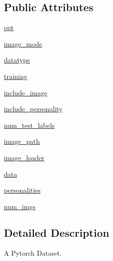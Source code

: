 \subsection*{Public Attributes}
\begin{DoxyCompactItemize}
\item 
\hyperlink{classparlai_1_1tasks_1_1personality__captions_1_1agents_1_1DefaultDataset_abe6bd53066bf10f26ef80157335cd6b9}{opt}
\item 
\hyperlink{classparlai_1_1tasks_1_1personality__captions_1_1agents_1_1DefaultDataset_a949e2d3987a90701c9280fd8f8b7b377}{image\+\_\+mode}
\item 
\hyperlink{classparlai_1_1tasks_1_1personality__captions_1_1agents_1_1DefaultDataset_a6463726aaf7a9bd790e11f049f0e7459}{datatype}
\item 
\hyperlink{classparlai_1_1tasks_1_1personality__captions_1_1agents_1_1DefaultDataset_a859342ffaf7f760cda952bc662cd7da3}{training}
\item 
\hyperlink{classparlai_1_1tasks_1_1personality__captions_1_1agents_1_1DefaultDataset_a14602789e47c31f02e86779207c539ed}{include\+\_\+image}
\item 
\hyperlink{classparlai_1_1tasks_1_1personality__captions_1_1agents_1_1DefaultDataset_a7224aca680b70755ada4619c5e769e3e}{include\+\_\+personality}
\item 
\hyperlink{classparlai_1_1tasks_1_1personality__captions_1_1agents_1_1DefaultDataset_a704ea7215d132aa1eaa5e058c95215e7}{num\+\_\+test\+\_\+labels}
\item 
\hyperlink{classparlai_1_1tasks_1_1personality__captions_1_1agents_1_1DefaultDataset_a73b3feee08eff4ccd268b348080bc9f4}{image\+\_\+path}
\item 
\hyperlink{classparlai_1_1tasks_1_1personality__captions_1_1agents_1_1DefaultDataset_ae8aa6d7d5869a14df29403626d053b0f}{image\+\_\+loader}
\item 
\hyperlink{classparlai_1_1tasks_1_1personality__captions_1_1agents_1_1DefaultDataset_a52ccf1dae943d045a66a7bcc66804638}{data}
\item 
\hyperlink{classparlai_1_1tasks_1_1personality__captions_1_1agents_1_1DefaultDataset_ab50f9303d20d862328f4961fc20e0428}{personalities}
\item 
\hyperlink{classparlai_1_1tasks_1_1personality__captions_1_1agents_1_1DefaultDataset_aa3268ee6597893589b2142645be2ad2c}{num\+\_\+imgs}
\end{DoxyCompactItemize}


\subsection{Detailed Description}
\begin{DoxyVerb}A Pytorch Dataset.\end{DoxyVerb}
 

